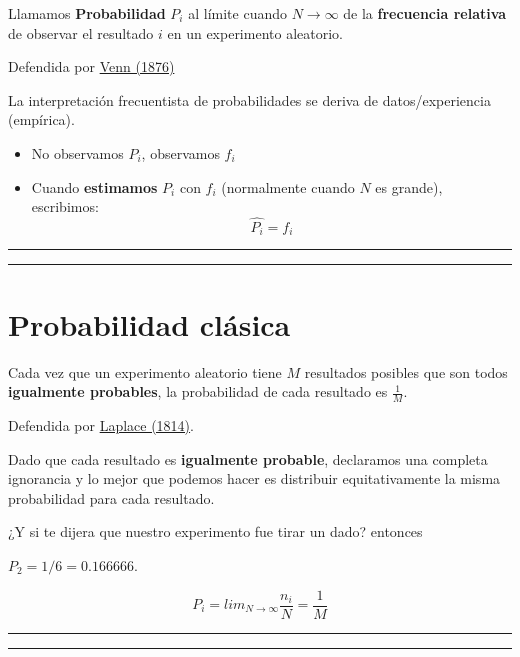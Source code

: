 \documentclass[
]{book}
\providecommand{\tightlist}{%
  \setlength{\itemsep}{0pt}\setlength{\parskip}{0pt}}
\begin{document}
Llamamos \textbf{Probabilidad} \(P_i\) al límite cuando \(N \rightarrow \infty\) de la \textbf{frecuencia relativa} de observar el resultado \(i\) en un experimento aleatorio.

Defendida por \href{https://plato.stanford.edu/entries/probability-interpret/\#ClaPro}{Venn (1876)}

La interpretación frecuentista de probabilidades se deriva de datos/experiencia (empírica).

\begin{itemize}
\tightlist
\item
  No observamos \(P_i\), observamos \(f_i\)
\item
  Cuando \textbf{estimamos} \(P_i\) con \(f_i\) (normalmente cuando \(N\) es grande), escribimos: \[\hat{P_i}=f_i\]
\end{itemize}

\begin{center}\rule{0.5\linewidth}{0.5pt}\end{center}

\begin{center}\rule{0.5\linewidth}{0.5pt}\end{center}

\hypertarget{probabilidad-cluxe1sica}{%
\section{Probabilidad clásica}\label{probabilidad-cluxe1sica}}

Cada vez que un experimento aleatorio tiene \(M\) resultados posibles que son todos \textbf{igualmente probables}, la probabilidad de cada resultado es \(\frac{1}{M}\).

Defendida por \href{https://plato.stanford.edu/entries/probability-interpret/\#ClaPro}{Laplace (1814)}.

Dado que cada resultado es \textbf{igualmente probable}, declaramos una completa ignorancia y lo mejor que podemos hacer es distribuir equitativamente la misma probabilidad para cada resultado.

¿Y si te dijera que nuestro experimento fue tirar un dado? entonces

\(P_2=1/6=0.166666\).

\[P_i=lim_{N\rightarrow \infty} \frac{n_i}{N}=\frac{1}{M}\]

\begin{center}\rule{0.5\linewidth}{0.5pt}\end{center}

\begin{center}\rule{0.5\linewidth}{0.5pt}\end{center}
\end{document}
